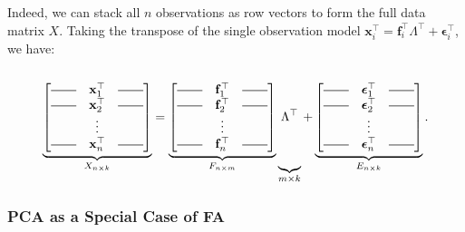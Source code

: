 \documentclass[12pt]{article}
\begin{document}
Indeed, we can stack all $n$ observations as row vectors to form the full data matrix $X$. Taking the transpose of the single observation model $\mathbf{x}_i^\top = \mathbf{f}_i^\top \Lambda^\top + \boldsymbol{\epsilon}_i^\top$, we have:

\[
\underbrace{\begin{bmatrix}
\rule[2pt]{20pt}{0.5pt} \quad \mathbf{x}_1^\top \quad \rule[2pt]{20pt}{0.5pt} \\
\rule[2pt]{20pt}{0.5pt} \quad \mathbf{x}_2^\top \quad \rule[2pt]{20pt}{0.5pt} \\
\vdots \\
\rule[2pt]{20pt}{0.5pt} \quad \mathbf{x}_n^\top \quad \rule[2pt]{20pt}{0.5pt}
\end{bmatrix}}_{X_{n \times k}}
=
\underbrace{\begin{bmatrix}
\rule[2pt]{20pt}{0.5pt} \quad \mathbf{f}_1^\top \quad \rule[2pt]{20pt}{0.5pt} \\
\rule[2pt]{20pt}{0.5pt} \quad \mathbf{f}_2^\top \quad \rule[2pt]{20pt}{0.5pt} \\
\vdots \\
\rule[2pt]{20pt}{0.5pt} \quad \mathbf{f}_n^\top \quad \rule[2pt]{20pt}{0.5pt}
\end{bmatrix}}_{F_{n \times m}}
\underbrace{\vphantom{\begin{bmatrix} \vdots \\ \vdots \\ \vdots \\ \vdots \end{bmatrix}} \Lambda^\top}_{m \times k}
+
\underbrace{\begin{bmatrix}
\rule[2pt]{20pt}{0.5pt} \quad \boldsymbol{\epsilon}_1^\top \quad \rule[2pt]{20pt}{0.5pt} \\
\rule[2pt]{20pt}{0.5pt} \quad \boldsymbol{\epsilon}_2^\top \quad \rule[2pt]{20pt}{0.5pt} \\
\vdots \\
\rule[2pt]{20pt}{0.5pt} \quad \boldsymbol{\epsilon}_n^\top \quad \rule[2pt]{20pt}{0.5pt}
\end{bmatrix}}_{E_{n \times k}}.
\]

\subsubsection{PCA as a Special Case of FA}
\end{document}

